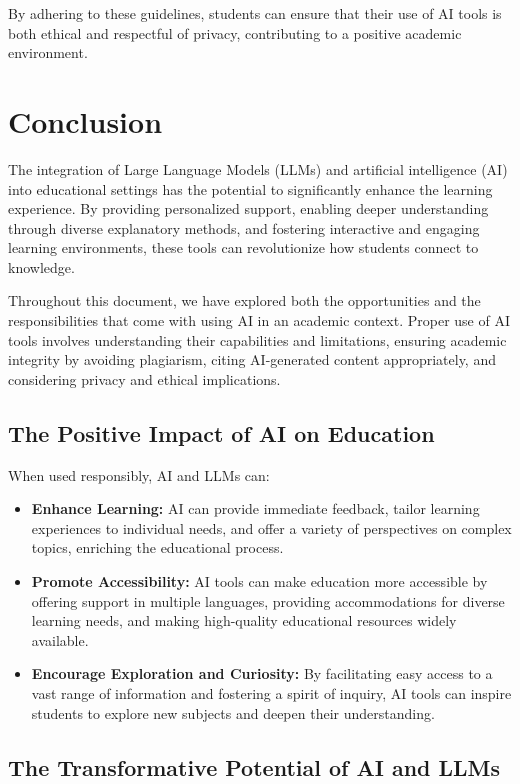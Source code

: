 \documentclass{article}
\begin{document}
By adhering to these guidelines, students can ensure that their use of AI tools is both ethical and respectful of privacy, contributing to a positive academic environment.


\section{Conclusion}

The integration of Large Language Models (LLMs) and artificial intelligence (AI) into educational settings has the potential to significantly enhance the learning experience. By providing personalized support, enabling deeper understanding through diverse explanatory methods, and fostering interactive and engaging learning environments, these tools can revolutionize how students connect to knowledge.

Throughout this document, we have explored both the opportunities and the responsibilities that come with using AI in an academic context. Proper use of AI tools involves understanding their capabilities and limitations, ensuring academic integrity by avoiding plagiarism, citing AI-generated content appropriately, and considering privacy and ethical implications.

\subsection{The Positive Impact of AI on Education}

When used responsibly, AI and LLMs can:

\begin{itemize}
    \item \textbf{Enhance Learning:} AI can provide immediate feedback, tailor learning experiences to individual needs, and offer a variety of perspectives on complex topics, enriching the educational process.
    \item \textbf{Promote Accessibility:} AI tools can make education more accessible by offering support in multiple languages, providing accommodations for diverse learning needs, and making high-quality educational resources widely available.
    \item \textbf{Encourage Exploration and Curiosity:} By facilitating easy access to a vast range of information and fostering a spirit of inquiry, AI tools can inspire students to explore new subjects and deepen their understanding.
\end{itemize}

\subsection{The Transformative Potential of AI and LLMs}
\end{document}
